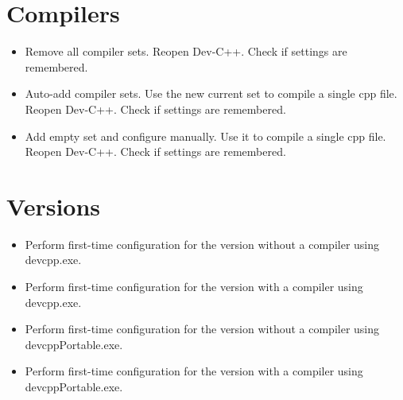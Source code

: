 \documentclass{article}
\begin{document}
\section{Compilers}
\begin{itemize}
    \item Remove all compiler sets. Reopen Dev-C++. Check if settings are remembered.
    \item Auto-add compiler sets. Use the new current set to compile a single cpp file. Reopen Dev-C++. Check if settings are remembered.
    \item Add empty set and configure manually. Use it to compile a single cpp file. Reopen Dev-C++. Check if settings are remembered.
\end{itemize}

\clearpage
\section{Versions}
\begin{itemize}
    \item Perform first-time configuration for the version without a compiler using devcpp.exe.
    \item Perform first-time configuration for the version with a compiler using devcpp.exe.
    \item Perform first-time configuration for the version without a compiler using devcppPortable.exe.
    \item Perform first-time configuration for the version with a compiler using devcppPortable.exe.
\end{itemize}
\end{document}
